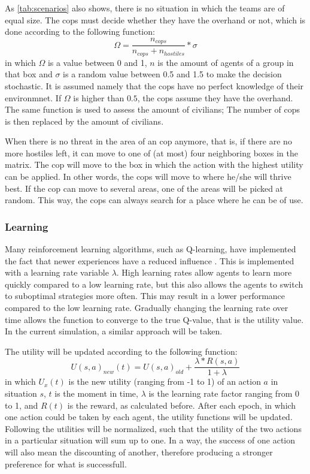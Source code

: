 As \autoref{tab:scenarios} also shows, there is no situation in which the teams are of equal size. The cops must decide whether they have the overhand or not, which is done according to the following function:
$$ \Omega = \frac{n_{cops}}{n_{cops} + n_{hostiles}}*\sigma $$
in which $\Omega$ is a value between 0 and 1, $n$ is the amount of agents of a group in that box and $\sigma$ is a random value between 0.5 and 1.5 to make the decision stochastic. It is assumed namely that the cops have no perfect knowledge of their environmnet. If $\Omega$ is higher than $0.5$, the cops assume they have the overhand. The same function is used to assess the amount of civilians; The number of cops is then replaced by the amount of civilians. 

When there is no threat in the area of an cop anymore, that is, if there are no more hostiles left, it can move to one of (at most) four neighboring boxes in the matrix. The cop will move to the box in which the action with the highest utility can be applied. In other words, the cops will move to where he/she will thrive best. If the cop can move to several areas, one of the areas will be picked at random. This way, the cops can always search for a place where he can be of use. 

\subsubsection{Learning}
Many reinforcement learning algorithms, such as Q-learning, have implemented the fact that newer experiences have a reduced influence  \citep*{watkins1992q}. This is implemented with a learning rate variable $\lambda$. High learning rates allow agents to learn more quickly compared to a low learning rate, but this also allows the agents to switch to suboptimal strategies more often. This may result in a lower performance compared to the low learning rate. Gradually changing the learning rate over time allows the function to converge to the true Q-value, that is the utility value. In the current simulation, a similar approach will be taken. 

The utility will be updated according to the following function:
$$ U(s,a)_{new}(t) = U(s,a)_{old} + \frac{\lambda * R(s,a)}{1+\lambda} $$
in which $U_x(t)$ is the new utility (ranging from -1 to 1) of an action $a$ in situation $s$, $t$ is the moment in time, $\lambda$ is the learning rate factor ranging from 0 to 1, and $R(t)$ is the reward, as calculated before. After each epoch, in which one action could be taken by each agent, the utility functions will be updated. Following the utilities will be normalized, such that the utility of the two actions in a particular situation will sum up to one. In a way, the success of one action will also mean the discounting of another, therefore producing a stronger preference for what is successfull. 

